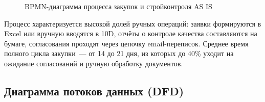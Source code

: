 \documentclass[12pt,a4paper]{article}
\begin{document}
\begin{figure}[H]
\caption{BPMN-диаграмма процесса закупок и стройконтроля AS IS}
\label{fig:bpmn_asis}
\end{figure}

Процесс характеризуется высокой долей ручных операций: заявки формируются в Excel или вручную вводятся в 10D, отчёты о контроле качества составляются на бумаге, согласования проходят через цепочку email-переписок. Среднее время полного цикла закупки~--- от 14 до 21 дня, из которых до 40\% уходит на ожидание согласований и ручную обработку документов.

\subsection{Диаграмма потоков данных (DFD)}
\end{document}
